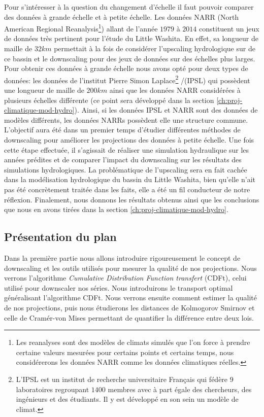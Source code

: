 \documentclass[a4paper,11pt]{article}
\numberwithin{equation}{section}
\begin{document}
Pour s'intéresser à la question du changement d'échelle il faut pouvoir comparer des données à grande échelle et à petite échelle. Les données NARR (North American Regional Reanalysis\footnote{Les reanalyses sont des modèles de climats simulés que l'on force à prendre certaine valeurs mesurées pour certains points et certains temps, nous considérerons les données NARR comme les données climatiques réelles.}) allant de l'année $1979$ à $2014$ constituent un jeux de données très pertinent pour l'étude du Little Washita. En effet, sa longueur de maille de $32km$ permettait à la fois de considérer l'upscaling hydrologique sur de ce bassin et le downscaling pour des jeux de données sur des échelles plus larges. Pour obtenir ces données à grande échelle nous avons opté pour deux types de données: les données de l'institut Pierre Simon Laplace\footnote{ L'IPSL est un institut de recherche universitaire Français qui fédère $9$ laboratoires regroupant $1400$ membres avec à part égale des chercheurs, des ingénieurs et des étudiants. Il y est développé en son sein un modèle de climat.} /(IPSL) qui possèdent une longueur de maille de $200km$ ainsi que les données NARR considérées à plusieurs échelles différente (ce point sera développé dans la section \ref{ch:proj-climatique-mod-hydro}).
Ainsi, si les données IPSL et NARR sont des données de modèles différents, les données NARRs possèdent elle une structure commune. L'objectif aura été dans un premier temps d'étudier différentes méthodes de downscaling pour améliorer les projections des données à petite échelle. Une fois cette étape effectuée, il s'agissait de réaliser une simulation hydraulique sur les années prédites et de comparer l'impact du downscaling sur les résultats des simulations hydrologiques. La problématique de l'upscaling sera en fait cachée dans la modélisation hydrologique du bassin du Little Washita, bien qu'elle n'ait pas été concrètement traitée dans les faits, elle a été un fil conducteur de notre réflexion. Finalement, nous donnons les résultats obtenus ainsi que les conclusions que nous en avons tirées dans la section \ref{ch:proj-climatique-mod-hydro}.

\subsection{Présentation du plan}
\label{ch:presentation plan}

Dans la première partie nous allons introduire rigoureusement le concept de downscaling et les outils utilisés pour mesurer la qualité de nos projections. Nous verrons l'algorithme \textit{Cumulative Distribution Function transfert} (CDFt), celui utilisé pour downscaler nos séries. Nous introduirons le transport optimal généralisant l'algorithme CDFt. Nous verrons ensuite comment estimer la qualité de nos projections, puis nous étudierons les distances de Kolmogorov Smirnov et celle de Cramér-von Mises permettant de quantifier la différence entre deux lois. 
\end{document}
